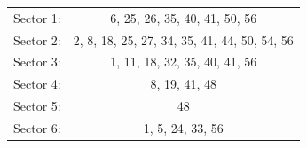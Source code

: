\begin{v2}
\begin{table}
\begin{center}
\begin{singlespacing}
\begin{tabular}{lc}

\hline \hline

Sector 1: & 6, 25, 26, 35, 40, 41, 50, 56\\
Sector 2: & 2, 8, 18, 25, 27, 34, 35, 41, 44, 50, 54, 56\\
Sector 3: & 1, 11, 18, 32, 35, 40, 41, 56\\
Sector 4: & 8, 19, 41, 48 \\
Sector 5: & 48\\
Sector 6: & 1, 5, 24, 33, 56 \\

\hline \hline

\end{tabular}

\end{singlespacing}
\end{center}
\end{table}


\end{v2}

\FloatBarrier
